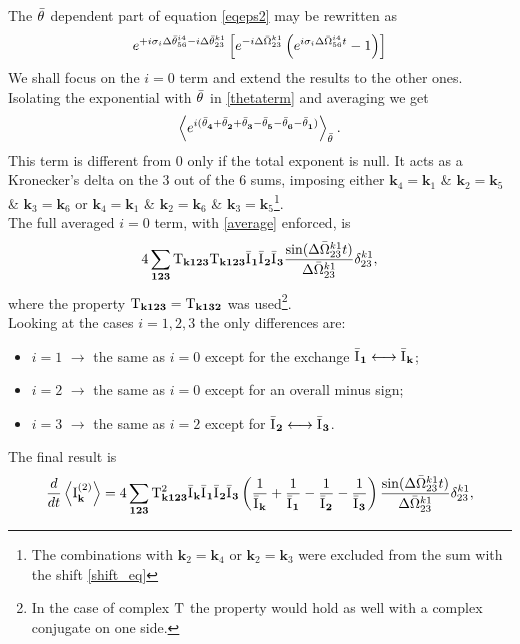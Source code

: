 The $\bar{\theta}^{}$ dependent part of equation \eqref{eqeps2} may be rewritten as 
\begin{equation}
    e^{+i\sigma_i\Delta\bar{\theta}^{i4}_{56} -i \Delta\bar{\theta}^{k1}_{23}}\left[e^{-i\Delta\bar{\Omega}^{k1}_{23}}\left(e^{i\sigma_i\Delta\bar{\Omega}^{i4}_{56}t}-1\right)  \right]
    \label{thetaterm}
\end{equation}
We shall focus on the $i=0$ term and extend the results to the other ones. Isolating the exponential with $\bar{\theta}^{}$ in \eqref{thetaterm} and averaging we get
\begin{equation}
    \left\langle e^{i(\bar{\theta}^{}_\mathbf{4} +\bar{\theta}^{}_\mathbf{2} + \bar{\theta}^{}_\mathbf{3} - \bar{\theta}^{}_\mathbf{5} - \bar{\theta}^{}_\mathbf{6} - \bar{\theta}^{}_\mathbf{1})} \right\rangle_{\bar{\theta}^{}}.
    \label{average}
\end{equation} 
This term is different from $0$ only if the total exponent is null. It acts as a Kronecker's delta on the $3$ out of the $6$ sums, imposing either $\mathbf{k}_4=\mathbf{k}_1$ \& $\mathbf{k}_2 = \mathbf{k}_5$ \&
$\mathbf{k}_3 = \mathbf{k}_6$ or $\mathbf{k}_4=\mathbf{k}_1$ \& $\mathbf{k}_2 = \mathbf{k}_6$ \& $\mathbf{k}_3 = \mathbf{k}_5$\footnote{The combinations with $\mathbf{k}_2 = \mathbf{k}_4$ or $\mathbf{k}_2 = \mathbf{k}_3$ were 
excluded from the sum with the shift \eqref{shift_eq}}. \\
The full averaged $i=0$ term, with \eqref{average} enforced, is 
\begin{equation}
    4 \sum_{\mathbf{123}} \mathrm{T}_{\mathbf{k123}}\mathrm{T}_{\mathbf{k123}}\bar{\mathrm{I}^{}}_\mathbf{1}\bar{\mathrm{I}^{}}_\mathbf{2}\bar{\mathrm{I}^{}}_\mathbf{3}\frac{\sin(\Delta\bar{\Omega}^{k1}_{23}t)}{\Delta\bar{\Omega}^{k1}_{23}}\delta^{k1}_{23},
\end{equation}
where the property $\mathrm{T}_{\mathbf{k123}} = \mathrm{T}_{\mathbf{k132}}$ was used\footnote{In the case of complex $\mathrm{T}$ the property would hold as well with a complex conjugate on one side.}.
\\
Looking at the cases $i =1,2,3$ the only differences are:
\begin{itemize}
    \item $i=1$ $\longrightarrow$ the same as $i=0$ except for the exchange $\bar{\mathrm{I}^{}}_\mathbf{1} \longleftrightarrow \bar{\mathrm{I}^{}}_\mathbf{k}$;
    \item $i=2$ $\longrightarrow$ the same as $i=0$ except for an overall minus sign;
    \item $i=3$ $\longrightarrow$ the same as $i=2$ except for  $\bar{\mathrm{I}^{}}_\mathbf{2} \longleftrightarrow \bar{\mathrm{I}^{}}_\mathbf{3}$.
\end{itemize}
The final result is
\begin{equation}
    \frac{d}{dt} \left\langle \mathrm{I}^{(2)}_\mathbf{k}\right\rangle = 4 \sum_{\mathbf{123}} \mathrm{T}^2_\mathbf{k123}\bar{\mathrm{I}^{}}_\mathbf{k}\bar{\mathrm{I}^{}}_\mathbf{1}\bar{\mathrm{I}^{}}_\mathbf{2}\bar{\mathrm{I}^{}}_\mathbf{3}
    \left(\frac{1}{\bar{\mathrm{I}^{}}_\mathbf{k}} + \frac{1}{\bar{\mathrm{I}^{}}_\mathbf{1}} - \frac{1}{\bar{\mathrm{I}^{}}_\mathbf{2}}- \frac{1}{\bar{\mathrm{I}^{}}_\mathbf{3}}  \right)
    \frac{\sin(\Delta\bar{\Omega}^{k1}_{23}t)}{\Delta\bar{\Omega}^{k1}_{23}}\delta^{k1}_{23},
    \label{kinetic1}
\end{equation}
